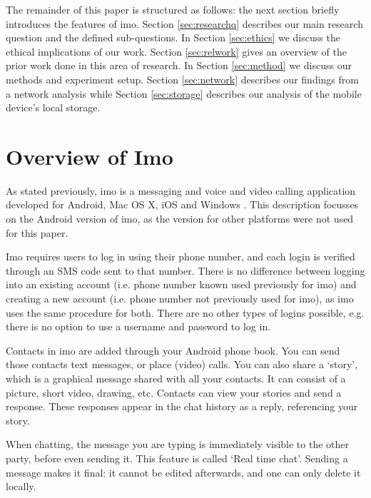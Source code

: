 \documentclass[conference]{IEEEtran}
\begin{document}
The remainder of this paper is structured as follows: the next section briefly
introduces the features of imo. Section \ref{sec:researchq} describes our main
research question and the defined sub-questions. In Section \ref{sec:ethics} we
discuss the ethical implications of our work. Section \ref{sec:relwork} gives an
overview of the prior work done in this area of research. In Section
\ref{sec:method} we discuss our methods and experiment setup. Section
\ref{sec:network} describes our findings from a network analysis while Section
\ref{sec:storage} describes our analysis of the mobile device's local storage.



\section{Overview of Imo}

As stated previously, imo is a messaging and voice and video calling application
developed for Android, Mac OS X, iOS and Windows \cite{imo}. This description
focusses on the Android version of imo, as the version for other platforms were
not used for this paper.

Imo requires users to log in using their phone number, and each login is
verified through an SMS code sent to that number. There is no difference between
logging into an existing account (i.e. phone number known used previously for
imo) and creating a new account (i.e. phone number not previously used for imo),
as imo uses the same procedure for both. There are no other types of logins
possible, e.g. there is no option to use a username and password to log in.

Contacts in imo are added through your Android phone book. You can send those
contacts text messages, or place (video) calls. You can also share a `story',
which is a graphical message shared with all your contacts. It can consist of a
picture, short video, drawing, etc. Contacts can view your stories and send a
response. These responses appear in the chat history as a reply, referencing
your story.

When chatting, the message you are typing is immediately visible to the other
party, before even sending it. This feature is called `Real time chat'. Sending
a message makes it final: it cannot be edited afterwards, and one can only
delete it locally.
\end{document}
